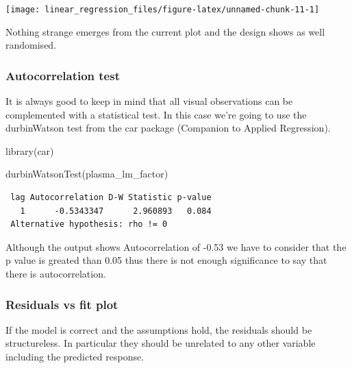 \documentclass[
]{book}
\newenvironment{Shaded}{\begin{snugshade}}{\end{snugshade}}
\newcommand{\FunctionTok}[1]{\textcolor[rgb]{0.00,0.00,0.00}{#1}}
\newcommand{\NormalTok}[1]{#1}
\begin{document}
\texttt{[image: linear\_regression\_files/figure-latex/unnamed-chunk-11-1]}

Nothing strange emerges from the current plot and the design shows as well randomised.

\hypertarget{residualsCorrelation}{%
\subsubsection{Autocorrelation test}\label{residualsCorrelation}}

It is always good to keep in mind that all visual observations can be complemented with a statistical test. In this case we're going to use the durbinWatson test from the car package (Companion to Applied Regression).

\begin{Shaded}
\begin{Highlighting}[]
\FunctionTok{library}\NormalTok{(car)}
\end{Highlighting}
\end{Shaded}

\begin{Shaded}
\begin{Highlighting}[]
\FunctionTok{durbinWatsonTest}\NormalTok{(plasma\_lm\_factor)}
\end{Highlighting}
\end{Shaded}

\begin{verbatim}
 lag Autocorrelation D-W Statistic p-value
   1      -0.5343347      2.960893   0.084
 Alternative hypothesis: rho != 0
\end{verbatim}

Although the output shows Autocorrelation of -0.53 we have to consider that the p value is greated than 0.05 thus there is not enough significance to say that there is autocorrelation.

\hypertarget{residuals-vs-fit-plot}{%
\subsubsection{Residuals vs fit plot}\label{residuals-vs-fit-plot}}

If the model is correct and the assumptions hold, the residuals should be structureless. In particular they should be unrelated to any other variable including the predicted response.
\end{document}
